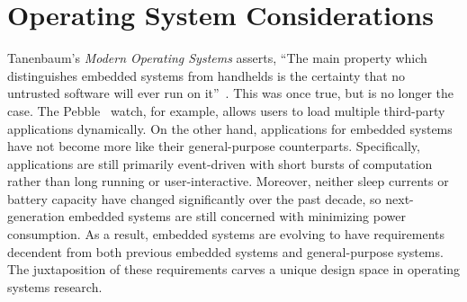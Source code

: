 \section{Operating System Considerations}
\label{os-considerations}

Tanenbaum's \emph{Modern Operating Systems} asserts, ``The main property which
distinguishes embedded systems from handhelds is the certainty that no untrusted
software will ever run on it''~\cite{tanenbaum}. This was once true, but is no
longer the case. The Pebble~\cite{pebble} watch, for example, allows users to
load multiple third-party applications dynamically. On the other hand,
applications for embedded systems have not become more like their
general-purpose counterparts. Specifically, applications are still primarily
event-driven with short bursts of computation rather than long running or
user-interactive. Moreover, neither sleep currents or battery capacity have
changed significantly over the past decade, so next-generation embedded systems
are still concerned with minimizing power consumption.  As a result, embedded
systems are evolving to have requirements decendent from both previous embedded
systems and general-purpose systems. The juxtaposition of these requirements
carves a unique design space in operating systems research.



%


